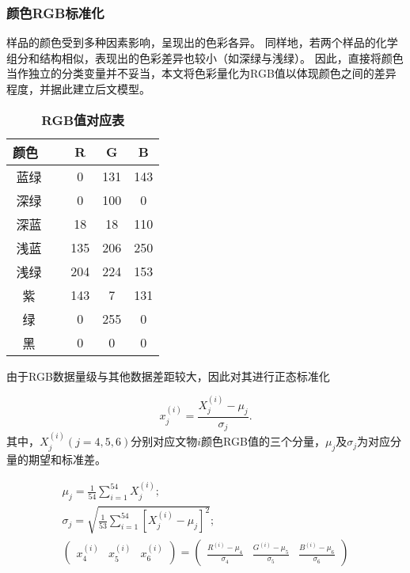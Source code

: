\subsubsection{颜色RGB标准化} %
\label{ssub:颜色RGB标准化}

样品的颜色受到多种因素影响，呈现出的色彩各异。
同样地，若两个样品的化学组分和结构相似，表现出的色彩差异也较小（如深绿与浅绿）。
因此，直接将颜色当作独立的分类变量并不妥当，本文将色彩量化为RGB值以体现颜色之间的差异程度，并据此建立后文模型。

\begin{table}[!htp]
\caption{\bf RGB值对应表}
\setlength{\tabcolsep}{7mm}
\centering
\begin{tabular}{clccc}
\toprule
颜色~ &  & R   & G   & B    \\
\midrule
蓝绿  &  & 0   & 131 & 143  \\
深绿  &  & 0   & 100 & 0    \\
深蓝  &  & 18  & 18  & 110  \\
浅蓝  &  & 135 & 206 & 250  \\
浅绿  &  & 204 & 224 & 153  \\
紫   &  & 143 & 7   & 131  \\
绿   &  & 0   & 255 & 0    \\
黑   &  & 0   & 0   & 0    \\
\bottomrule
\end{tabular}
\end{table}

由于RGB数据量级与其他数据差距较大，因此对其进行正态标准化

\begin{equation}
	x_{j}^{(i)}=\frac{X_{j}^{(i)}-\mu_{j}}{\sigma_{j}}.
\end{equation}
其中，$X_j^{(i)}(j=4,5,6)$分别对应文物$i$颜色RGB值的三个分量，$\mu_j$及$\sigma_j$为对应分量的期望和标准差。

\begin{equation}
	\begin{array}{c}
\mu_{j}=\frac{1}{54} \sum_{i=1}^{54} X_{j}^{(i)};\\
\sigma_{j}=\sqrt{\frac{1}{53} \sum_{i=1}^{54}\left[X_{j}^{(i)}-\mu_{j}\right]^{2}}; \\
\left(\begin{array}{ccc} x_{4}^{(i)}& x_{5}^{(i)}& x_{6}^{(i)}\end{array}\right)=\left(\begin{array}{ccc}\frac{R^{(i)}-\mu_{4}}{\sigma_{4}}& \frac{G^{(i)}-\mu_{5}}{\sigma_{5}} &\frac{B^{(i)}-\mu_{6}}{\sigma_{6}}\end{array}\right)
\end{array}
\end{equation}


